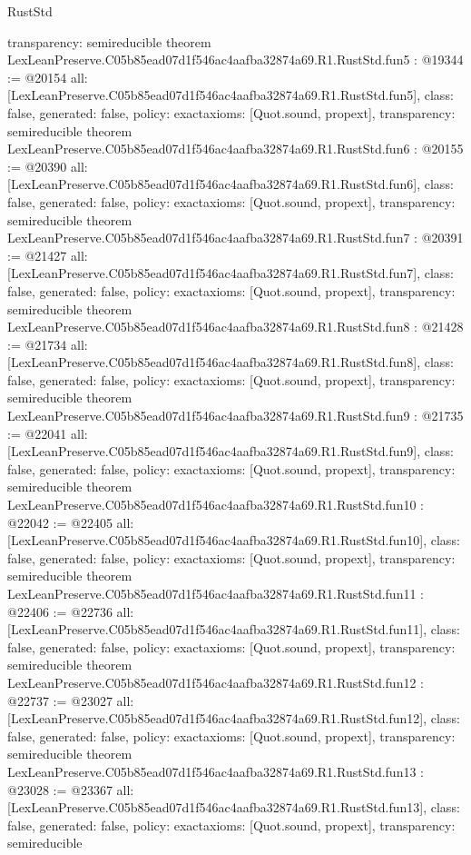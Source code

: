 \begin{lexlean}{RustStd}
\begin{coremodule}
{  transparency: semireducible
}
theorem LexLeanPreserve.C05b85ead07d1f546ac4aafba32874a69.R1.RustStd.fun5 : @19344 := @20154 {
  all: [LexLeanPreserve.C05b85ead07d1f546ac4aafba32874a69.R1.RustStd.fun5],
  class: false,
  generated: false,
  policy: exact{axioms: [Quot.sound, propext]},
  transparency: semireducible
}
theorem LexLeanPreserve.C05b85ead07d1f546ac4aafba32874a69.R1.RustStd.fun6 : @20155 := @20390 {
  all: [LexLeanPreserve.C05b85ead07d1f546ac4aafba32874a69.R1.RustStd.fun6],
  class: false,
  generated: false,
  policy: exact{axioms: [Quot.sound, propext]},
  transparency: semireducible
}
theorem LexLeanPreserve.C05b85ead07d1f546ac4aafba32874a69.R1.RustStd.fun7 : @20391 := @21427 {
  all: [LexLeanPreserve.C05b85ead07d1f546ac4aafba32874a69.R1.RustStd.fun7],
  class: false,
  generated: false,
  policy: exact{axioms: [Quot.sound, propext]},
  transparency: semireducible
}
theorem LexLeanPreserve.C05b85ead07d1f546ac4aafba32874a69.R1.RustStd.fun8 : @21428 := @21734 {
  all: [LexLeanPreserve.C05b85ead07d1f546ac4aafba32874a69.R1.RustStd.fun8],
  class: false,
  generated: false,
  policy: exact{axioms: [Quot.sound, propext]},
  transparency: semireducible
}
theorem LexLeanPreserve.C05b85ead07d1f546ac4aafba32874a69.R1.RustStd.fun9 : @21735 := @22041 {
  all: [LexLeanPreserve.C05b85ead07d1f546ac4aafba32874a69.R1.RustStd.fun9],
  class: false,
  generated: false,
  policy: exact{axioms: [Quot.sound, propext]},
  transparency: semireducible
}
theorem LexLeanPreserve.C05b85ead07d1f546ac4aafba32874a69.R1.RustStd.fun10 : @22042 := @22405 {
  all: [LexLeanPreserve.C05b85ead07d1f546ac4aafba32874a69.R1.RustStd.fun10],
  class: false,
  generated: false,
  policy: exact{axioms: [Quot.sound, propext]},
  transparency: semireducible
}
theorem LexLeanPreserve.C05b85ead07d1f546ac4aafba32874a69.R1.RustStd.fun11 : @22406 := @22736 {
  all: [LexLeanPreserve.C05b85ead07d1f546ac4aafba32874a69.R1.RustStd.fun11],
  class: false,
  generated: false,
  policy: exact{axioms: [Quot.sound, propext]},
  transparency: semireducible
}
theorem LexLeanPreserve.C05b85ead07d1f546ac4aafba32874a69.R1.RustStd.fun12 : @22737 := @23027 {
  all: [LexLeanPreserve.C05b85ead07d1f546ac4aafba32874a69.R1.RustStd.fun12],
  class: false,
  generated: false,
  policy: exact{axioms: [Quot.sound, propext]},
  transparency: semireducible
}
theorem LexLeanPreserve.C05b85ead07d1f546ac4aafba32874a69.R1.RustStd.fun13 : @23028 := @23367 {
  all: [LexLeanPreserve.C05b85ead07d1f546ac4aafba32874a69.R1.RustStd.fun13],
  class: false,
  generated: false,
  policy: exact{axioms: [Quot.sound, propext]},
  transparency: semireducible
}
\end{coremodule}
\end{lexlean}
